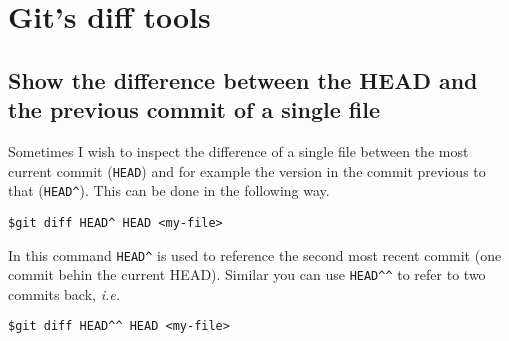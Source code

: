 \documentclass{article}
\begin{document}
\section{Git's diff tools}

\subsection{Show the difference between the HEAD and the previous commit of a single file}
Sometimes I wish to inspect the difference of a single file between the most current commit (\verb|HEAD|)
and for example the version in the commit previous to that (\verb|HEAD^|). This can be done in the following way.
\begin{lstlisting}
$git diff HEAD^ HEAD <my-file>
\end{lstlisting}
In this command \verb|HEAD^| is used to reference the second most recent commit (one commit behin the current HEAD).
Similar you can use \verb|HEAD^^| to refer to two commits back, \textit{i.e.}
\begin{lstlisting}
$git diff HEAD^^ HEAD <my-file>
\end{lstlisting}
\end{document}
